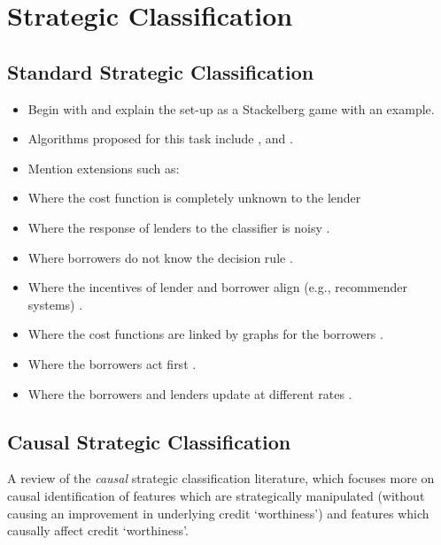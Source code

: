 \section{Strategic Classification}

\subsection{Standard Strategic Classification}


\begin{itemize}
	\item Begin with \textcite{hardtStrategicClassification2016} and explain the set-up as a Stackelberg game with an example.
	
	\item Algorithms proposed for this task include  \textcite{levanonStrategicClassificationMade2021}, \textcite{chenLearningStrategyAwareLinear2020} and \textcite{ahmadiClassificationStrategicAgents2022}. 
	
	\item Mention extensions such as:
	
	\item Where the cost function is completely unknown to the lender \citep{dongStrategicClassificationRevealed2018}
	
	\item Where the response of lenders to the classifier is noisy \citep{jagadeesanAlternativeMicrofoundationsStrategic2021}.
	
	\item Where borrowers do not know the decision rule \citep{ghalmeStrategicClassificationDark2021, bechavodInformationDiscrepancyStrategic2022}.
	
	\item Where the incentives of lender and borrower align (e.g., recommender systems) \citep{levanonGeneralizedStrategicClassification2022}.
	
	\item Where the cost functions are linked by graphs for the borrowers \citep{eilatStrategicClassificationGraph2023}.
	
	\item Where the borrowers act first \citep{nairStrategicRepresentation2022}.
	
	\item Where the borrowers and lenders update at different rates \citep{zrnicWhoLeadsWho2021}.
\end{itemize}

\subsection{Causal Strategic Classification}
A review of the \textit{causal} strategic classification literature, which focuses more on causal identification of features which are strategically manipulated (without causing an improvement in underlying credit `worthiness') and features which causally affect credit `worthiness'.



